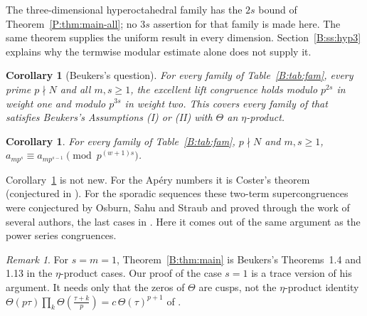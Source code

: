 \documentclass[11pt,a4paper]{article}
\newtheorem{corollary}[theorem]{Corollary}
\theoremstyle{definition}\newtheorem{definition}[theorem]{Definition}
\theoremstyle{remark}\newtheorem{remark}[theorem]{Remark}
\numberwithin{equation}{section}
\begin{document}
The three-dimensional hyperoctahedral family has the $2s$ bound of Theorem~\ref{P:thm:main-all}; no $3s$ assertion for that family is made here. The same theorem supplies the uniform result in every dimension. Section~\ref{B:ss:hyp3} explains why the termwise modular estimate alone does not supply it.

\begin{corollary}[Beukers's question]\label{B:cor:Beu}
For every family of Table~\ref{B:tab:fam}, every prime $p\nmid N$ and all $m,s\ge1$, the excellent
lift congruence holds modulo $p^{2s}$ in weight one and modulo $p^{3s}$ in weight two. This
covers every family of \cite[App.~B, C]{Beu26} that satisfies Beukers's Assumptions (I) or (II)
with $\Theta$ an $\eta$-product.
\end{corollary}

\begin{corollary}\label{B:cor:coef}
For every family of Table~\ref{B:tab:fam}, $p\nmid N$ and $m,s\ge1$,
$a_{mp^s}\equiv a_{mp^{s-1}}\pmod{p^{(w+1)s}}$.
\end{corollary}

Corollary~\ref{B:cor:coef} is not new. For the Ap\'ery numbers it is Coster's theorem
\cite{Co88} (conjectured in \cite{Beu85}). For the sporadic sequences these two-term
supercongruences were conjectured by Osburn, Sahu and Straub \cite{OSS16} and proved through the
work of several authors, the last cases in \cite{St23,AO23}. Here it comes out of the same
argument as the power series congruences.

\begin{remark}
For $s=m=1$, Theorem~\ref{B:thm:main} is Beukers's Theorems~1.4 and 1.13 \cite{Beu26} in the
$\eta$-product cases. Our proof of the case $s=1$ is a trace version of his argument. It
needs only that the zeros of $\Theta$ are cusps, not the $\eta$-product identity
$\Theta(p\tau)\prod_k\Theta(\frac{\tau+k}p)=c\,\Theta(\tau)^{p+1}$ of \cite[Lemma~3.2]{Beu26}.
\end{remark}
\end{document}
